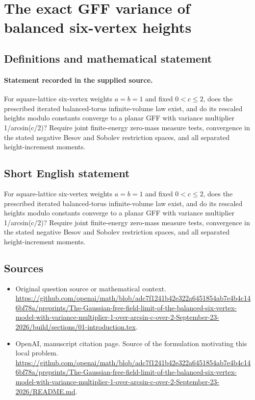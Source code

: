 \documentclass[11pt]{article}
\begin{document}
\section*{The exact GFF variance of balanced six-vertex heights}\label{statement}
\subsection{Definitions and mathematical statement}
\paragraph{Statement recorded in the supplied source.}
For square-lattice six-vertex weights $a=b=1$ and fixed $0<c\leq 2$, does the prescribed iterated balanced-torus infinite-volume law exist, and do its rescaled heights modulo constants converge to a planar GFF with variance multiplier 1/arcsin(c/2)? Require joint finite-energy zero-mass measure tests, convergence in the stated negative Besov and Sobolev restriction spaces, and all separated height-increment moments.
\subsection{Short English statement}
For square-lattice six-vertex weights $a=b=1$ and fixed $0<c\leq 2$, does the prescribed iterated balanced-torus infinite-volume law exist, and do its rescaled heights modulo constants converge to a planar GFF with variance multiplier 1/arcsin(c/2)? Require joint finite-energy zero-mass measure tests, convergence in the stated negative Besov and Sobolev restriction spaces, and all separated height-increment moments.
\subsection{Sources}
\begin{itemize}
\item[S1] Original question source or mathematical context.
\url{https://github.com/openai/math/blob/adc7f1241b42e322a6451854ab7e4b4c146bf78a/preprints/The-Gaussian-free-field-limit-of-the-balanced-six-vertex-model-with-variance-multiplier-1-over-arcsin-c-over-2-September-23-2026/build/sections/01-introduction.tex}.
\item[S2] OpenAI, manuscript citation page. Source of the formulation motivating this local problem.
\url{https://github.com/openai/math/blob/adc7f1241b42e322a6451854ab7e4b4c146bf78a/preprints/The-Gaussian-free-field-limit-of-the-balanced-six-vertex-model-with-variance-multiplier-1-over-arcsin-c-over-2-September-23-2026/README.md}.
\end{itemize}
\end{document}
